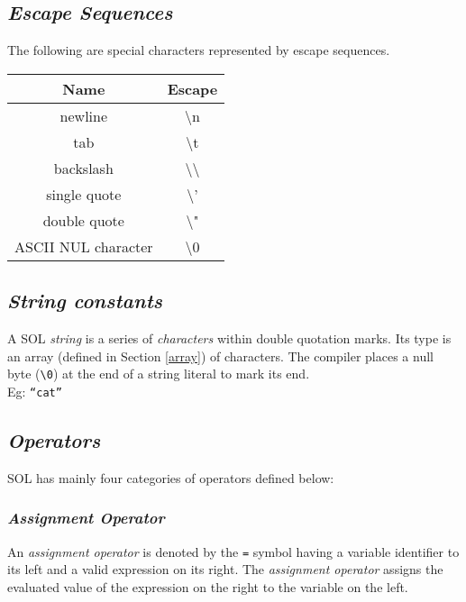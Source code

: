 \documentclass[letterpaper,12pt]{article}
\begin{document}
    \subsection{\textit{Escape Sequences}}
    The following are special characters represented by escape sequences.
        \begin{center}
            \begin{tabular}{ |c|c| }
            \hline
                \textbf{Name}   & \textbf{Escape}\\
                \hline
                newline         & \textbackslash n\\
                tab             & \textbackslash t\\
                backslash       & \textbackslash \textbackslash\\
                single quote    & \textbackslash '\\
                double quote    & \textbackslash "\\
                ASCII NUL character & \textbackslash 0\\
            \hline
            \end{tabular}
        \end{center}

    \subsection{\textit{String constants}}
    A SOL \textit{string} is a series of \textit{characters} within double quotation marks. Its type is an array (defined in Section \ref{array}) of characters. The compiler places a null byte (\texttt{\textbackslash0}) at the end of a string literal to mark its end.\\
    Eg: \texttt{“cat”}

	\subsection{\textit{Operators}}
    SOL has mainly four categories of operators defined below:

        \subsubsection{\textit{Assignment Operator}}
        An \textit{assignment operator} is denoted by the \texttt{=} symbol having a variable identifier to its left and a valid expression on its right. The \textit{assignment operator} assigns the evaluated value of the expression on the right to the variable on the left.
\end{document}

